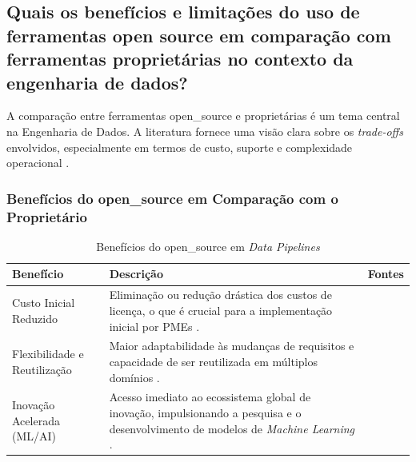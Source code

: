 \subsection{Quais os benefícios e limitações do uso de ferramentas open source em comparação com ferramentas proprietárias no contexto da engenharia de dados?}
\label{sec:respostas:comparacao}

A comparação entre ferramentas \acs{open_source} e proprietárias é um tema central na Engenharia de Dados. A literatura fornece uma visão clara sobre os \textit{trade-offs} envolvidos, especialmente em termos de custo, suporte e complexidade operacional \cite[]{septian2019, nwokeji2021, murarka2024, mbata2024survey}.

\subsubsection{Benefícios do \acs{open_source} em Comparação com o Proprietário}
\begin{table}[h!]
    \label{tab:beneficios_os}
    \small
    \begin{tabular}{p{3.0cm} p{8.5cm} p{1.5cm}}
        \toprule
        \textbf{Benefício} & \textbf{Descrição} & \textbf{Fontes} \\
        \midrule
        Custo Inicial Reduzido & Eliminação ou redução drástica dos custos de licença, o que é crucial para a implementação inicial por PMEs \cite[]{septian2019}. & \cite[]{septian2019} \\
        \rowcolor[gray]{0.95}
        Flexibilidade e Reutilização & Maior adaptabilidade às mudanças de requisitos e capacidade de ser reutilizada em múltiplos domínios \cite[]{nwokeji2021}. & \cite[]{nwokeji2021} \\
        Inovação Acelerada (ML/AI) & Acesso imediato ao ecossistema global de inovação, impulsionando a pesquisa e o desenvolvimento de modelos de \textit{Machine Learning} \cite[]{reddi2021data}. & \cite[]{reddi2021data} \\
        \bottomrule
    \end{tabular}
        \centering
    \caption{Benefícios do \acs{open_source} em \textit{Data Pipelines}}
\end{table}

\pagebreak

